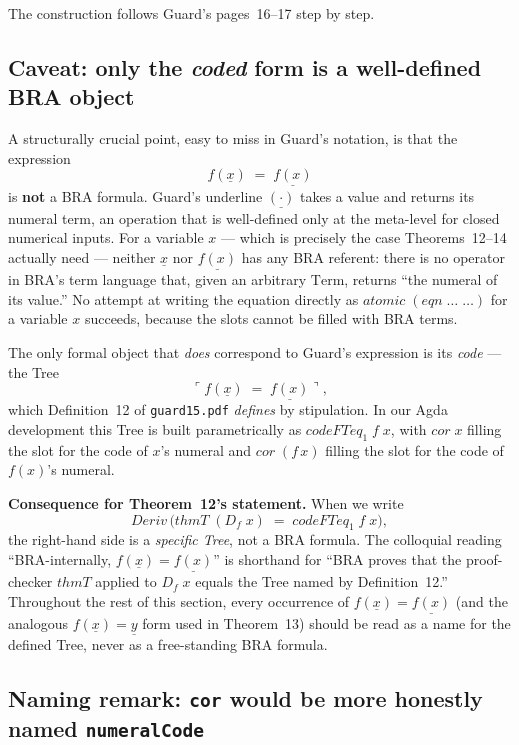 \documentclass[11pt]{article}
\begin{document}
The construction follows Guard's pages~16--17 step by step.

\subsection{Caveat: only the \emph{coded} form is a well-defined BRA object}
\label{subsec:underline-caveat}

A structurally crucial point, easy to miss in Guard's notation, is that
the expression
\[
  f(\underline{x}) \;=\; \underline{f(x)}
\]
is \textbf{not} a BRA formula.  Guard's underline $\underline{(\cdot)}$
takes a value and returns its numeral term, an operation that is
well-defined only at the meta-level for closed numerical inputs.  For
a variable $x$ --- which is precisely the case Theorems~12--14 actually
need --- neither $\underline{x}$ nor $\underline{f(x)}$ has any BRA
referent: there is no operator in BRA's term language that, given an
arbitrary $\mathrm{Term}$, returns ``the numeral of its value.''  No
attempt at writing the equation directly as
$\mathit{atomic}\;(\mathit{eqn}\;\ldots\;\ldots)$ for a variable $x$
succeeds, because the slots cannot be filled with BRA terms.

The only formal object that \emph{does} correspond to Guard's
expression is its \emph{code} --- the Tree
\[
  \ulcorner f(\underline{x}) \;=\; \underline{f(x)} \urcorner,
\]
which Definition~12 of \texttt{guard15.pdf} \emph{defines} by
stipulation.  In our Agda development this Tree is built parametrically
as $\mathit{codeFTeq}_1\;f\;x$, with $\mathit{cor}\;x$ filling the slot
for the code of $x$'s numeral and $\mathit{cor}\;(f\,x)$ filling the
slot for the code of $f(x)$'s numeral.

\textbf{Consequence for Theorem~12's statement.}  When we write
\[
  \mathit{Deriv}\,\big(\mathit{thmT}\;(D_f\;x)
       \;=\; \mathit{codeFTeq}_1\;f\;x\big),
\]
the right-hand side is a \emph{specific Tree}, not a BRA formula.  The
colloquial reading ``BRA-internally, $f(\underline{x}) =
\underline{f(x)}$'' is shorthand for ``BRA proves that the proof-checker
$\mathit{thmT}$ applied to $D_f\;x$ equals the Tree named by
Definition~12.''  Throughout the rest of this section, every occurrence
of $f(\underline{x}) = \underline{f(x)}$ (and the analogous
$f(\underline{x}) = \underline{y}$ form used in Theorem~13) should be
read as a name for the defined Tree, never as a free-standing BRA
formula.

\subsection{Naming remark: \texttt{cor} would be more honestly named \texttt{numeralCode}}
\label{subsec:cor-naming-remark}
\end{document}
